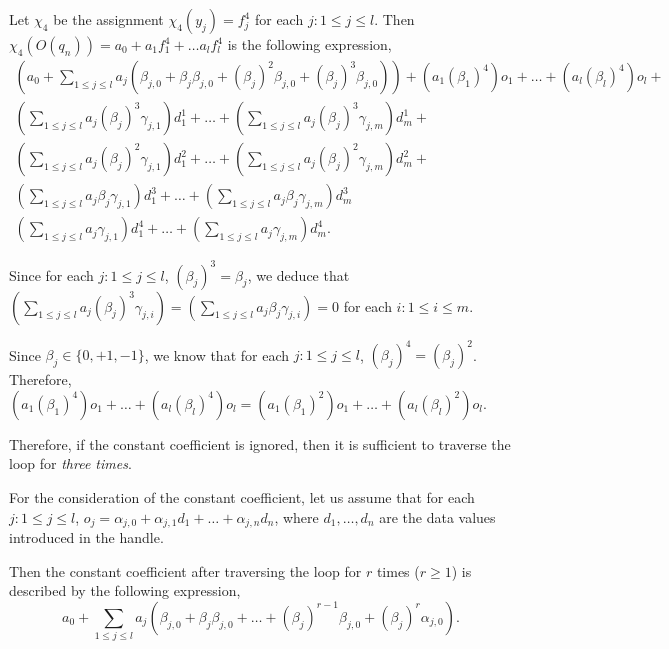 \documentclass[11pt]{article}
\begin{document}
Let $\chi_4$ be the assignment $\chi_4(y_j)=f^4_j$ for each $j: 1\le j \le l$.
Then $\chi_4(O(q_n)) = a_0+ a_1 f^4_1 + \dots a_l f^4_l$ is the following expression,
\[
\begin{array}{l}
(a_0 + \sum \limits_{1 \le j \le l} a_j (\beta_{j,0} + \beta_{j} \beta_{j,0} + (\beta_j)^2 \beta_{j,0} + (\beta_j)^3 \beta_{j,0})) +  (a_1 (\beta_1)^4) o_1 + \dots + (a_l (\beta_l)^4) o_l + \\
 (\sum \limits_{1 \le j \le l} a_j (\beta_{j})^3\gamma_{j,1}) d^1_1 + \dots + (\sum \limits_{1 \le j \le l} a_j (\beta_{j})^3\gamma_{j,m}) d^1_m + \\
 (\sum \limits_{1 \le j \le l} a_j (\beta_{j})^2\gamma_{j,1}) d^2_1 + \dots + (\sum \limits_{1 \le j \le l} a_j (\beta_{j})^2\gamma_{j,m}) d^2_m + \\
(\sum \limits_{1 \le j \le l} a_j \beta_j \gamma_{j,1}) d^3_1 + \dots + (\sum \limits_{1 \le j \le l} a_j \beta_j \gamma_{j,m}) d^3_m \\
(\sum \limits_{1 \le j \le l} a_j \gamma_{j,1}) d^4_1 + \dots + (\sum \limits_{1 \le j \le l} a_j \gamma_{j,m}) d^4_m. 
\end{array}
\]

Since for each $j: 1\le j \le l$, $(\beta_j)^3=\beta_j$, we deduce that $(\sum \limits_{1 \le j \le l} a_j (\beta_{j})^3\gamma_{j,i}) = (\sum \limits_{1 \le j \le l} a_j \beta_{j} \gamma_{j,i}) =0$ for each $i: 1\le i \le m$.

Since $\beta_j \in \{0,+1,-1\}$, we know that for each $j: 1\le j \le l$, $(\beta_j)^4=(\beta_j)^2$. Therefore, $(a_1 (\beta_1)^4) o_1 + \dots + (a_l (\beta_l)^4) o_l=(a_1 (\beta_1)^2) o_1 + \dots + (a_l (\beta_l)^2) o_l$.

Therefore, if the constant coefficient is ignored, then it is sufficient to traverse the loop for \emph{three times}.

For the consideration of the constant coefficient, let us assume that for each $j: 1 \le j \le l$, 
$o_j = \alpha_{j,0} + \alpha_{j,1} d_1+ \dots + \alpha_{j,n}d_n$, where $d_1,\dots,d_n$ are the data values introduced in the handle.

Then the constant coefficient after traversing the loop for $r$ times ($r \ge 1$) is described by the following expression,
\[a_0 + \sum \limits_{1 \le j \le l} a_j (\beta_{j,0} + \beta_{j} \beta_{j,0} + \dots + (\beta_j)^{r-1} \beta_{j,0} + (\beta_j)^r \alpha_{j,0}).\]
\end{document}
